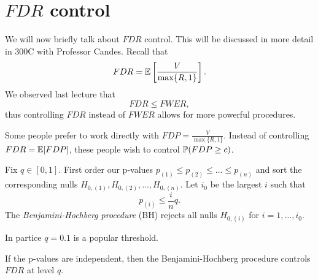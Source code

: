 \section{$FDR$ control}
We will now briefly talk about $FDR$ control. This will be discussed in more detail in 300C with Professor Candes. Recall that 
\[FDR = {\mathbb{E}}\left[\frac{V}{\max\{R,1\}}\right]. \]
We observed last lecture that
\[FDR \le FWER,\]
thus controlling $FDR$ instead of $FWER$ allows for more powerful procedures.
\begin{remark}
    Some people prefer to work directly with $FDP = \frac{V}{\max\{R,1\}}$. Instead of controlling $FDR={\mathbb{E}}[FDP]$, these people wish to control ${\mathbb{P}}(FDP \ge c)$.
\end{remark} 
\begin{defn}
    Fix $q \in [0,1]$. First order our p-values $p_{(1)}\le p_{(2)} \le \ldots \le p_{(n)}$ and sort the corresponding nulls $H_{0,(1)},H_{0,(2)},\ldots,H_{0,(n)}$. Let $i_0$ be the largest $i$ such that 
    \[p_{(i)} \le \frac{i}{n}q. \]
    The \emph{Benjamini-Hochberg procedure} (BH) rejects all nulls $H_{0,(i)}$ for $i=1,\ldots,i_0$.
\end{defn}
In partice $q=0.1$ is a popular threshold.
\begin{prop}
    If the p-values are independent, then the Benjamini-Hochberg procedure controls $FDR$ at level $q$.
\end{prop}
